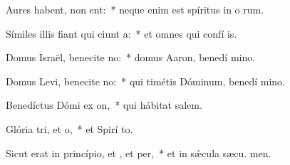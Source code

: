 \item Aures habent,  non ent:~* neque enim est spíritus in o rum.
\item Símiles illis fiant qui ciunt a:~* et omnes qui confí  is.
\item Domus Israël, benecite no:~* domus Aaron, benedí mino.
\item Domus Levi, benecite no:~* qui timétis Dóminum, benedí mino.
\item Benedíctus Dómi ex on,~* qui hábitat  salem.
\item Glória tri, et o,~* et Spirí to.
\item Sicut erat in princípio, et , et per,~* et in sǽcula sæcu. men.
